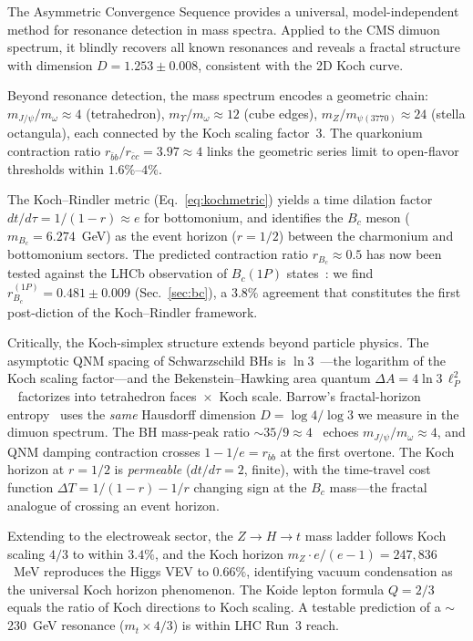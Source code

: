 \documentclass[twocolumn,showpacs,preprintnumbers,amsmath,amssymb,prl]{revtex4-2}
\begin{document}
The Asymmetric Convergence Sequence provides a universal,
model-independent method for resonance detection in mass spectra.
Applied to the CMS dimuon spectrum, it blindly recovers all known
resonances and reveals a fractal structure with dimension
$D = 1.253 \pm 0.008$, consistent with the 2D Koch curve.

Beyond resonance detection, the mass spectrum encodes a geometric chain:
$m_{J/\psi}/m_\omega \approx 4$ (tetrahedron), $m_{\Upsilon}/m_\omega \approx 12$
(cube edges), $m_Z/m_{\psi(3770)} \approx 24$ (stella octangula),
each connected by the Koch scaling factor~3.
The quarkonium contraction ratio $r_{\bar{b}b}/r_{\bar{c}c} = 3.97 \approx 4$
links the geometric series limit to open-flavor thresholds within $1.6\%$--$4\%$.

The Koch--Rindler metric (Eq.~\ref{eq:kochmetric}) yields a time dilation
factor $dt/d\tau = 1/(1-r) \approx e$ for bottomonium, and identifies
the $B_c$ meson ($m_{B_c} = 6.274$~GeV) as the event horizon
($r = 1/2$) between the charmonium and bottomonium sectors.
The predicted contraction ratio $r_{B_c} \approx 0.5$ has now been
tested against the LHCb observation of $B_c(1P)$
states~\cite{LHCbBc1P}: we find $r_{B_c}^{(1P)} = 0.481 \pm 0.009$
(Sec.~\ref{sec:bc}), a $3.8\%$ agreement that constitutes the first
post-diction of the Koch--Rindler framework.

Critically, the Koch-simplex structure extends beyond particle physics.
The asymptotic QNM spacing of Schwarzschild BHs is
$\ln 3$~\cite{Motl2003}---the logarithm of the Koch scaling factor---and
the Bekenstein--Hawking area quantum
$\Delta A = 4\ln 3\,\ell_P^2$~\cite{Dreyer2003} factorizes into
tetrahedron faces~$\times$~Koch scale.
Barrow's fractal-horizon entropy~\cite{Barrow2020} uses the
\emph{same} Hausdorff dimension $D = \log 4/\log 3$ we measure in the
dimuon spectrum. The BH mass-peak ratio
$\sim\!35/9 \approx 4$~\cite{GWTC3pop} echoes
$m_{J/\psi}/m_\omega \approx 4$, and QNM damping contraction crosses
$1-1/e = r_{\bar{b}b}$ at the first overtone.
The Koch horizon at $r = 1/2$ is \emph{permeable}
($dt/d\tau = 2$, finite), with the time-travel cost function
$\Delta T = 1/(1-r) - 1/r$ changing sign at the $B_c$ mass---the
fractal analogue of crossing an event horizon.

Extending to the electroweak sector, the $Z \to H \to t$ mass ladder
follows Koch scaling $4/3$ to within $3.4\%$, and the Koch horizon
$m_Z \cdot e/(e-1) = 247{,}836$~MeV reproduces the Higgs VEV to $0.66\%$,
identifying vacuum condensation as the universal Koch horizon phenomenon.
The Koide lepton formula $Q = 2/3$ equals the ratio of Koch directions
to Koch scaling. A testable prediction of a $\sim$230~GeV resonance
($m_t \times 4/3$) is within LHC Run~3 reach.
\end{document}
